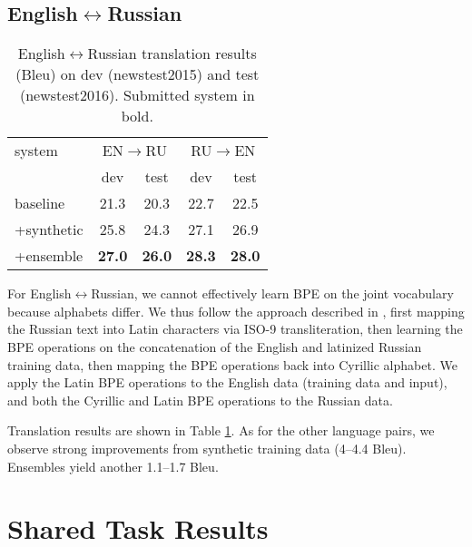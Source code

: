 \documentclass[11pt]{article}
\begin{document}
\subsection{English$\leftrightarrow$Russian}

\begin{table}
\centering
\begin{tabular}{l|cc|cc}
system & \multicolumn{2}{c|}{EN$\to$RU} & \multicolumn{2}{c}{RU$\to$EN}\\
& dev & test & dev & test\\
\hline
baseline & 21.3 & 20.3 &%
22.7 & 22.5 \\ %
+synthetic & 25.8& 24.3 &%
27.1 & 26.9\\ %
+ensemble & \textbf{27.0} & \textbf{26.0} &%
\textbf{28.3} & \textbf{28.0}\\ %
\end{tabular}
\caption{English$\leftrightarrow$Russian translation results ({\sc Bleu}) on dev (newstest2015) and test (newstest2016). Submitted system in bold.}
\label{results-ru}
\end{table}

For English$\leftrightarrow$Russian, we cannot effectively learn BPE on the joint vocabulary because alphabets differ.
We thus follow the approach described in \cite{DBLP:journals/corr/SennrichHB15}, first mapping the Russian text into Latin characters via ISO-9 transliteration,
then learning the BPE operations on the concatenation of the English and latinized Russian training data, then mapping the BPE operations back into Cyrillic alphabet.
We apply the Latin BPE operations to the English data (training data and input), and both the Cyrillic and Latin BPE operations to the Russian data.

Translation results are shown in Table \ref{results-ru}.
As for the other language pairs, we observe strong improvements from synthetic training data (4--4.4 {\sc Bleu}).
Ensembles yield another 1.1--1.7 {\sc Bleu}.


\section{Shared Task Results}
\end{document}
